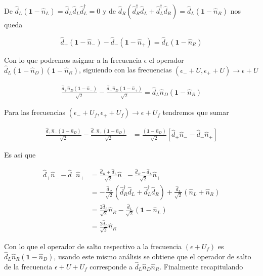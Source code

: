 \begin{appendixs}
De $\hat{d}_{L}(\textbf{1} - \hat{n}_{L}) = \hat{d}_{L}\hat{d}_{L}\hat{d}^{\dagger}_{L} = 0$ y de $\hat{d}_{R}(\hat{d}^{\dagger}_{R}\hat{d}_{L} + \hat{d}^{\dagger}_{L}\hat{d}_{R}) = \hat{d}_{L}(\textbf{1}-\hat{n}_{R})$ nos queda

\begin{equation*}
    \hat{d}_{+}(\textbf{1}-\hat{n}_{-}) - \hat{d}_{-}(\textbf{1}-\hat{n}_{+})  = \hat{d}_{L}(\textbf{1} - \hat{n}_{R})
\end{equation*}

Con lo que podremos asignar a la frecuencia $\epsilon$ el operador $\hat{d}_{L}(\textbf{1}-\hat{n}_{D})(\textbf{1}-\hat{n}_{R})$, siguiendo con las frecuencias $(\epsilon_{-}+U,\epsilon_{+}+U) \to \epsilon + U$

\begin{align*}
    \frac{\hat{d}_{+}\hat{n}_{D}(\textbf{1}-\hat{n}_{-})}{\sqrt{2}} - \frac{\hat{d}_{-}\hat{n}_{D}(\textbf{1}-\hat{n}_{+})}{\sqrt{2}} = \hat{d}_{L}\hat{n}_{D}(\textbf{1}-\hat{n}_{R}) 
\end{align*}

Para las frecuencias $(\epsilon_{-}+U_{f},\epsilon_{+}+U_{f}) \to \epsilon+U_{f}$ tendremos que sumar

\begin{align*}
    \frac{\hat{d}_{+}\hat{n}_{-}(\textbf{1}-\hat{n}_{D})}{\sqrt{2}} - \frac{\hat{d}_{-}\hat{n}_{+}(\textbf{1}-\hat{n}_{D})}{\sqrt{2}} & = \frac{(\textbf{1}-\hat{n}_{D})}{\sqrt{2}}[\hat{d}_{+}\hat{n}_{-} -\hat{d}_{-}\hat{n}_{+}] 
\end{align*}

Es así que

\begin{align*}
    \hat{d}_{+}\hat{n}_{-} -\hat{d}_{-}\hat{n}_{+} & = \frac{\hat{d}_{R}+\hat{d}_{L}}{\sqrt{2}}\hat{n}_{-} - \frac{\hat{d}_{R}-\hat{d}_{L}}{\sqrt{2}}\hat{n}_{+} \\
    & = - \frac{\hat{d}_{R}}{\sqrt{2}}(\hat{d}^{\dagger}_{R}\hat{d}_{L}+ \hat{d}^{\dagger}_{L}\hat{d}_{R}) + \frac{\hat{d}_{L}}{\sqrt{2}}(\hat{n}_{L}+\hat{n}_{R}) \\
    & = \frac{2\hat{d}_{L}}{\sqrt{2}}\hat{n}_{R} - \frac{\hat{d}_{L}}{\sqrt{2}}(\textbf{1}-\hat{n}_{L}) \\
    & = \frac{2\hat{d}_{L}}{\sqrt{2}}\hat{n}_{R}
\end{align*}

Con lo que el operador de salto respectivo a la frecuencia $(\epsilon+U_{f})$ es $\hat{d}_{L}\hat{n}_{R}(\textbf{1}-\hat{n}_{D})$, usando este mismo análisis se obtiene que el operador de salto de la frecuencia $\epsilon+U+U_{f}$ corresponde a $\hat{d}_{L}\hat{n}_{D}\hat{n}_{R}$. Finalmente recapitulando


\end{appendixs}
